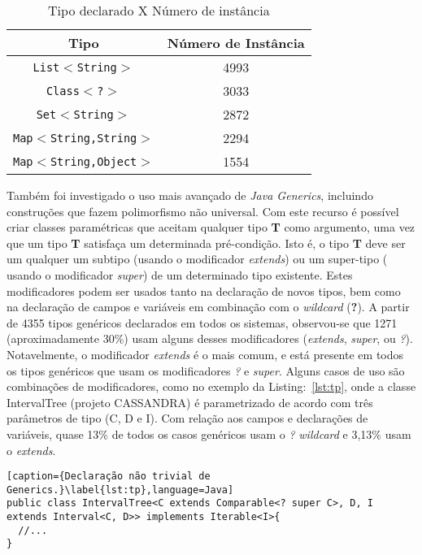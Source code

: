 \begin{table}[ht]
	\centering
	\caption{Tipo declarado X Número de instância}
	\begin{tabular}{cc}
		\hline
		Tipo & Número de Instância\\ 
		\hline \hline
		\texttt{List$<$String$>$} & 4993 \\ 
		\texttt{Class$<$?$>$} & 3033 \\ 
		\texttt{Set$<$String$>$} & 2872 \\ 
		\texttt{Map$<$String,String$>$} & 2294 \\ 
		\texttt{Map$ < $String,Object$>$} & 1554 \\ \hline
	\end{tabular}
	\label{tab:tipoXnumeroInstancia} %
\end{table}

Também foi investigado o uso mais avançado de \textit{Java Generics}, incluindo construções que fazem polimorfismo n\~{a}o universal. Com este recurso é possível criar classes paramétricas que aceitam qualquer tipo \textbf{T} 
como argumento, uma vez que um tipo \textbf{T} satisfaça um determinada 
pré-condição. Isto é, o tipo \textbf{T} deve ser um qualquer um subtipo (usando o modificador \textit{extends}) ou um super-tipo ( usando o modificador \textit{super}) de um determinado tipo existente. Estes modificadores podem 
ser usados tanto na declaração de novos tipos, bem como na declaração de campos e variáveis em combinação com o \textit{wildcard} (\textbf{?}). A partir 
de \num{4355} tipos genéricos declarados em todos os sistemas, 
observou-se que \num{1271} (aproximadamente 30\%) usam alguns 
desses modificadores (\textit{extends}, \textit{super}, ou \textit{?}). Notavelmente, o modificador \textit{extends} é o mais comum, e está presente em todos os tipos genéricos que usam os modificadores \textit{?} e \textit{super}. Alguns casos de uso são combinações de modificadores, como no exemplo da Listing:~\ref{lst:tp}, onde a classe IntervalTree (projeto CASSANDRA) é parametrizado de acordo com três parâmetros de tipo (C, D e I). Com relação aos campos e declarações de variáveis, quase 13\% de todos os casos genéricos usam o \textit{?} \textit{wildcard} e 3,13\% usam o \textit{extends}.

\begin{lstlisting}[caption={Declaração não trivial de Generics.}\label{lst:tp},language=Java] 
public class IntervalTree<C extends Comparable<? super C>, D, I extends Interval<C, D>> implements Iterable<I>{
  //...
}
\end{lstlisting}


